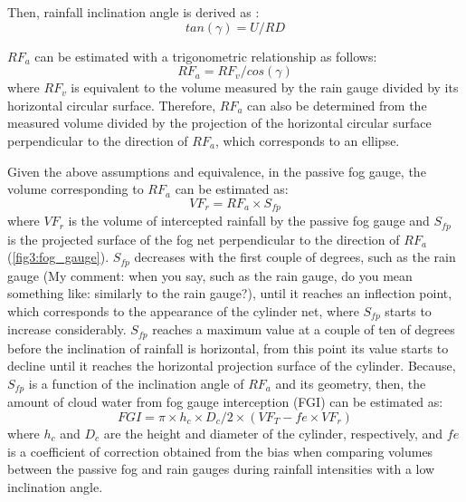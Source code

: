 \documentclass[a4paper,12pt]{article}
\begin{document}
\begin{linenumbers}
Then, rainfall inclination angle is derived as \citep{HerwitzandSlye1995, Holwerdaetal2006}:
\begin{equation} \label{eq:fog_gamma}
    tan(\gamma) = U/RD
\end{equation}

$RF_a$ can be estimated with a trigonometric relationship as follows:
 \begin{equation} \label{eq:fog_rain1}
    RF_a = RF_v/cos(\gamma)
\end{equation}
where $RF_v$ is equivalent to the volume measured by the rain gauge divided by its horizontal circular surface. Therefore, $RF_a$ can also be determined from the measured volume divided by the projection of the horizontal circular surface perpendicular to the direction of $RF_a$, which corresponds to an ellipse.

Given the above assumptions and equivalence, in the passive fog gauge, the volume corresponding to $RF_a$ can be estimated as:
 \begin{equation} \label{eq:fog_vol1}
    VF_r = RF_a \times S_{fp}
\end{equation}
where $VF_r$ is the volume of intercepted rainfall by the passive fog gauge and $S_{fp}$ is the projected surface of the fog net perpendicular to the direction of $RF_a$ (\autoref{fig3:fog_gauge}). $S_{fp}$ decreases with the first couple of degrees, such as the rain gauge (My comment: when you say, such as the rain gauge, do you mean something like: similarly to the rain gauge?), until it reaches an inflection point, which corresponds to the appearance of the cylinder net, where $S_{fp}$ starts to increase considerably. $S_{fp}$ reaches a maximum value at a couple of ten of degrees before the inclination of rainfall is horizontal, from this point its value starts to decline until it reaches the horizontal projection surface of the cylinder. Because, $S_{fp}$ is a function of the inclination angle of $RF_a$ and its geometry, then, the amount of cloud water from fog gauge interception (FGI) can be estimated as:
 \begin{equation} \label{eq:fog_fog}
    FGI = \pi \times h_c \times D_c/2 \times (VF_T - fe \times VF_r)
\end{equation}
where $h_c$ and $D_c$ are the height and diameter of the cylinder, respectively, and $fe$ is a coefficient of correction obtained from the bias when comparing volumes between the passive fog and rain gauges during rainfall intensities with a low inclination angle.



\end{linenumbers}
\end{document}
